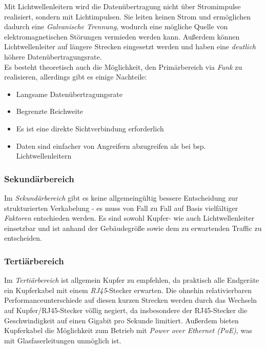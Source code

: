 \documentclass[a4paper, 12pt]{report}
\begin{document}
Mit Lichtwellenleitern wird die Datenübertragung nicht über Stromimpulse
realisiert, sondern mit Lichtimpulsen. Sie leiten keinen Strom und ermöglichen
dadurch eine \emph{Galvanische Trennung}, wodurch eine mögliche Quelle von
elektromagnetischen Störungen vermieden werden kann. Außerdem können
Lichtwellenleiter auf längere Strecken eingesetzt werden und haben eine
\emph{deutlich} höhere Datenübertragungsrate. \\

Es besteht theoretisch auch die Möglichkeit, den Primärbereich via \emph{Funk}
zu realisieren, allerdings gibt es einige Nachteile:

\begin{itemize}
    \item Langsame Datenübertragungsrate
    \item Begrenzte Reichweite
    \item Es ist eine direkte Sichtverbindung erforderlich
    \item Daten sind einfacher von Angreifern abzugreifen als bei bsp.
	Lichtwellenleitern
\end{itemize}

\newpage
\subsubsection{Sekundärbereich}

Im \emph{Sekundärbereich} gibt es keine allgemeingültig bessere Entscheidung
zur strukturierten Verkabelung - es muss von Fall zu Fall auf Basis vielfältiger
\emph{Faktoren} entschieden werden. Es sind sowohl Kupfer- wie auch
Lichtwellenleiter einsetzbar und ist anhand der Gebäudegröße sowie dem zu
erwartenden Traffic zu entscheiden.

\subsubsection{Tertiärbereich}

Im \emph{Tertiärbereich} ist allgemein Kupfer zu empfehlen, da praktisch alle
Endgeräte ein Kupferkabel mit einem \emph{RJ45}-Stecker erwarten. Die ohnehin
relativierbaren Performanceunterschiede auf diesen kurzen Strecken werden
durch das Wechseln auf Kupfer/RJ45-Stecker völlig negiert, da insbesondere der
RJ45-Stecker die Geschwindigkeit auf einen Gigabit pro Sekunde limitiert.
Außerdem bieten Kupferkabel die Möglichkeit zum Betrieb mit
\emph{Power over Ethernet (PoE)}, was mit Glasfaserleitungen unmöglich ist.
\end{document}
